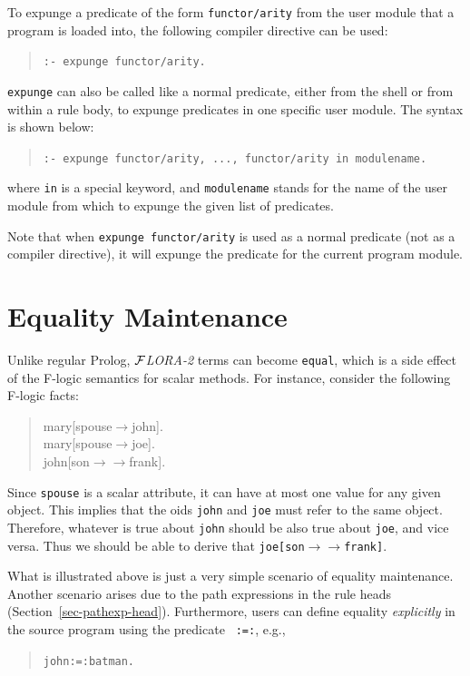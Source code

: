 \documentclass[11pt]{article}
\newcommand{\fd}{\ensuremath{{\rightarrow}}}                   %
\newcommand{\mvd}{\ensuremath{{\rightarrow\!\!\!\!\rightarrow}}}  %
\newcommand{\FLORA}{{\mbox{${\cal F}${\small\it LORA}\rm\emph{-2}}}\xspace}
\newcommand{\fl}{\mbox{F-logic}\xspace}
\begin{document}
%
To expunge a predicate of the form {\tt functor/arity} from the user module
that a program is loaded into, the following compiler directive can be
used:
\begin{quote}
\verb!:- expunge functor/arity.!
\end{quote}

\noindent
{\tt expunge} can also be called like a normal predicate,
either from the shell or from within a rule body, to expunge
predicates in one specific user module. The syntax is shown below:
\begin{quote}
\verb!:- expunge functor/arity, ..., functor/arity in modulename.!
\end{quote}
where {\tt in} is a special keyword, and {\tt modulename} stands for the
name of the user module from which to expunge the given list of predicates.

Note that when {\tt expunge functor/arity} is used as a normal predicate
(not as a compiler directive), it will expunge the predicate for the
current program module.




\section{Equality Maintenance}\label{sec-eqmaintain}


Unlike regular Prolog, \FLORA terms can become {\tt equal}, which is a side
effect of the \fl semantics for scalar methods.  For instance, consider the
following \fl facts:
\begin{quote}
mary[spouse{\fd}john]. \\
mary[spouse{\fd}joe]. \\
john[son{\mvd}frank].
\end{quote}
Since {\tt spouse} is a scalar attribute, it can have at most one value for
any given object. This implies that the oids {\tt john} and {\tt joe} must
refer to the same object. Therefore, whatever is true about {\tt john}
should be also true about {\tt joe}, and vice versa.  Thus we should be
able to derive that {\tt joe[son{\mvd}frank]}.

What is illustrated above is just a very simple scenario of equality
maintenance. Another scenario arises due to the path expressions in the
rule heads (Section~\ref{sec-pathexp-head}).  Furthermore, users can define
equality \emph{explicitly} in the source program using the predicate {\tt
  :=:}, e.g.,
\begin{quote}
\verb|john:=:batman.|
\end{quote}
\end{document}
